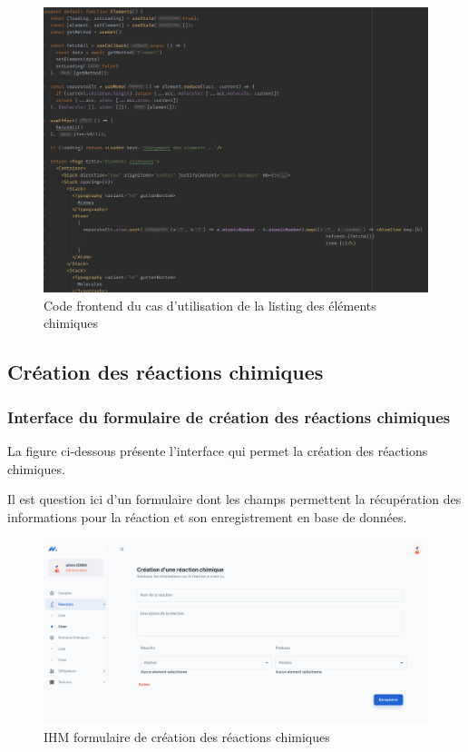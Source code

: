 \begin{figure}[H]
	\centering
	\includegraphics[width=1\textwidth]{img/fetl}
	\caption{Code frontend du cas d'utilisation de la listing des éléments chimiques}
\end{figure}

\subsection{Création des réactions chimiques}

\subsubsection{Interface du formulaire de création des réactions chimiques}

La figure ci-dessous présente l'interface qui permet la création des réactions chimiques. 

Il est question ici d'un formulaire dont les champs permettent la récupération des informations pour la réaction et son enregistrement en base de données.

\begin{figure}[H]
	\centering
	\includegraphics[width=1\textwidth]{img/icrc}
	\caption{IHM formulaire de création des réactions chimiques}
\end{figure}

